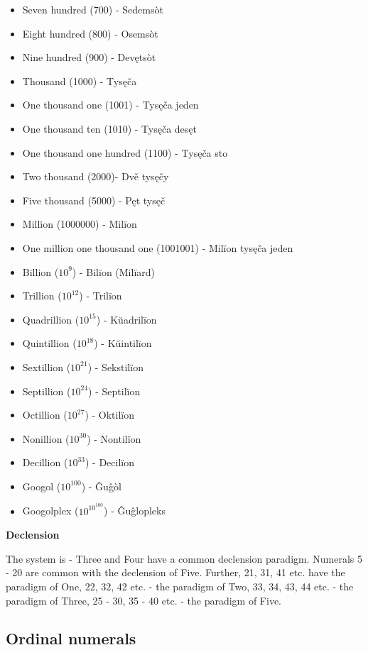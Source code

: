 \begin{itemize}
	\item Seven hundred (700) - Sedemsòt
	\item Eight hundred (800) - Osemsòt
	\item Nine hundred (900) - Devętsòt
	\item Thousand (1000) - Tysęča
	\item One thousand one (1001) - Tysęča jeden
	\item One thousand ten (1010) - Tysęča desęt
	\item One thousand one hundred (1100) - Tysęča sto
	\item Two thousand (2000)- Dvě tysęčy
	\item Five thousand (5000) - Pęt tysęč
	\item Million (1000000) - Milïon
	\item One million one thousand one (1001001) - Milïon tysęča jeden
	\item Billion ($10^9$) - Bilïon (Milïard)
	\item Trillion ($10^{12}$) - Trilïon
	\item Quadrillion ($10^{15}$) - Kŭadrilïon
	\item Quintillion ($10^{18}$) - Kŭintilïon
	\item Sextillion ($10^{21}$) - Sekstilïon
	\item Septillion ($10^{24}$) - Septilïon
	\item Octillion ($10^{27}$) - Oktilïon
	\item Nonillion ($10^{30}$) - Nontilïon
	\item Decillion ($10^{33}$) - Decilïon
	\item Googol ($10^{100}$) - Ĝuĝòl
	\item Googolplex ($10^{10^{100}}$) - Ĝuĝlopleks
\end{itemize}

\textbf{Declension}

The system is - Three and Four have a common declension paradigm. Numerals 5 - 20 are common with the declension of Five. Further, 21, 31, 41 etc. have the paradigm of One, 22, 32, 42 etc. - the paradigm of Two, 33, 34, 43, 44 etc. - the paradigm of Three, 25 - 30, 35 - 40 etc. - the paradigm of Five.

\subsection{Ordinal numerals}

